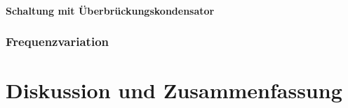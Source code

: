 \documentclass[12pt,english,ngerman]{scrartcl}
\begin{document}
\paragraph{Schaltung mit Überbrückungskondensator}

\subsubsection{Frequenzvariation}







\section{Diskussion und Zusammenfassung}\label{sec:Diskussion} 



\end{document}
